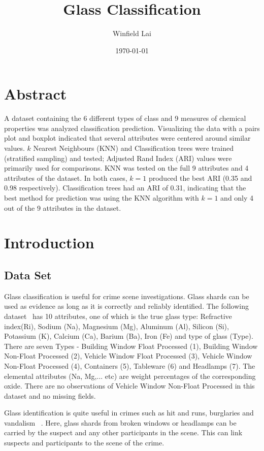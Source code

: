 \documentclass[12pt]{article}
\author{Winfield Lai}
\title{Glass Classification}
\date{\today}
\begin{document}
\maketitle

\section{Abstract}
A dataset containing the 6 different types of class and 9 measures of chemical properties was analyzed classification prediction. Visualizing the data with a pairs plot and boxplot indicated that several attributes were centered around similar values. $ k $ Nearest Neighbours (KNN) and Classification trees were trained  (stratified sampling) and tested; Adjusted Rand Index (ARI) values were primarily used for comparisons. KNN was tested on the full 9 attributes and 4 attributes of the dataset. In both cases, $ k=1 $ produced the best ARI (0.35 and 0.98 respectively). Classification trees had an ARI of 0.31, indicating that the best method for prediction was using the KNN algorithm with $ k=1 $ and only 4 out of the 9 attributes in the dataset. 

\section{Introduction}
\subsection{Data Set}
Glass classification is useful for crime scene investigations. Glass shards can be used as evidence as long as it is correctly and reliably identified. The following dataset~\cite{dataset} has 10 attributes, one of which is the true glass type: Refractive index(Ri), Sodium (Na), Magnesium (Mg), Aluminum (Al), Silicon (Si), Potassium (K), Calcium (Ca), Barium (Ba), Iron (Fe) and type of glass (Type). There are seven Types - Building Window Float Processed (1), Building Window Non-Float Processed (2), Vehicle Window Float Processed (3), Vehicle Window Non-Float Processed (4), Containers (5), Tableware (6) and Headlamps (7). The elemental attributes (Na, Mg,... etc) are weight percentages of the corresponding oxide. There are no observations of Vehicle Window Non-Float Processed in this dataset and no missing fields. 

Glass identification is quite useful in crimes such as hit and runs, burglaries and vandalism ~\cite{glassEvidence}. Here, glass shards from broken windows or headlamps can be carried by the suspect and any other participants in the scene. This can link suspects and participants to the scene of the crime. 
\end{document}
